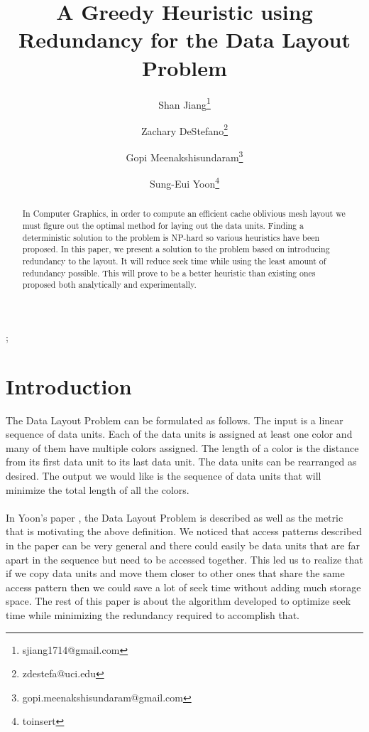 \documentclass[conference]{acmsiggraph}
\title{A Greedy Heuristic using Redundancy for the Data Layout Problem}
\author[1]{Shan Jiang\thanks{sjiang1714@gmail.com}}
\author[1]{Zachary DeStefano\thanks{zdestefa@uci.edu}}
\author[1]{Gopi Meenakshisundaram\thanks{gopi.meenakshisundaram@gmail.com}}
\author[2]{Sung-Eui Yoon\thanks{toinsert}}
\affil[1]{University of California, Irvine}
\affil[2]{KAIST}
\begin{document}

\maketitle

\begin{abstract}

In Computer Graphics, in order to compute an efficient cache oblivious mesh layout we must figure out the optimal method for laying out the data units. Finding a deterministic solution to the problem is NP-hard so various heuristics have been proposed. In this paper, we present a solution to the problem based on introducing redundancy to the layout. It will reduce seek time while using the least amount of redundancy possible. This will prove to be a better heuristic than existing ones proposed both analytically and experimentally. 

\end{abstract}

\begin{CRcatlist}
  ;
\end{CRcatlist}

\keywordlist


\TOGlinkslist


\copyrightspace

\section{Introduction}

The Data Layout Problem can be formulated as follows. The input is a linear sequence of data units. Each of the data units is assigned at least one color and many of them have multiple colors assigned. The length of a color is the distance from its first data unit to its last data unit. The data units can be rearranged as desired. The output we would like is the sequence of data units that will minimize the total length of all the colors. \\
\\
In Yoon's paper \cite{cacheobliviouslayout}, the Data Layout Problem is described as well as the metric that is motivating the above definition. We noticed that access patterns described in the paper can be very general and there could easily be data units that are far apart in the sequence but need to be accessed together. This led us to realize that if we copy data units and move them closer to other ones that share the same access pattern then we could save a lot of seek time without adding much storage space. The rest of this paper is about the algorithm developed to optimize seek time while minimizing the redundancy required to accomplish that. 
\end{document}
